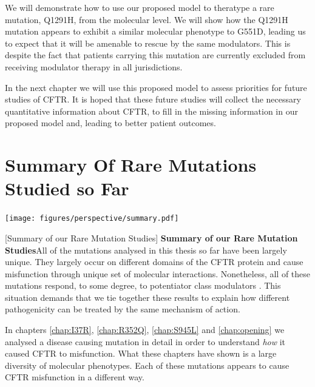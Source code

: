 We will demonstrate how to use our proposed model to theratype a rare mutation, Q1291H, from the molecular level. We will show how the Q1291H mutation appears to exhibit a similar molecular phenotype to G551D, leading us to expect that it will be amenable to rescue by the same modulators. This is despite the fact that patients carrying this mutation are currently excluded from receiving modulator therapy in all jurisdictions. 

In the next chapter we will use this proposed model to assess priorities for future studies of CFTR. It is hoped that these future studies will collect the necessary quantitative information about CFTR, to fill in the missing information in our proposed model and, leading to better patient outcomes. 



\section{Summary Of Rare Mutations Studied so Far}

	\begin{center}
		\texttt{[image: figures/perspective/summary.pdf]}
	\end{center}
\begingroup
\captionsetup{singlelinecheck = false, justification=raggedright}
[Summary of our Rare Mutation Studies] {\textbf{Summary of our Rare Mutation Studies}}{All of the mutations analysed in this thesis so far have been largely unique. They largely occur on different domains of the CFTR protein and cause misfunction through unique set of molecular interactions. Nonetheless, all of these mutations respond, to some degree, to potentiator class modulators \cite{wong2022, wong2022a, kim2018, vanwilligen2019}. This situation demands that we tie together these results to explain how different pathogenicity can be treated by the same mechanism of action. } 
\endgroup

In chapters \ref{chap:I37R}, \ref{chap:R352Q}, \ref{chap:S945L} and \ref{chap:opening} we analysed a disease causing mutation in detail in order to understand \textit{how} it caused CFTR to misfunction. What these chapters have shown is a large diversity of molecular phenotypes. Each of these mutations appears to cause CFTR misfunction in a different way. 

